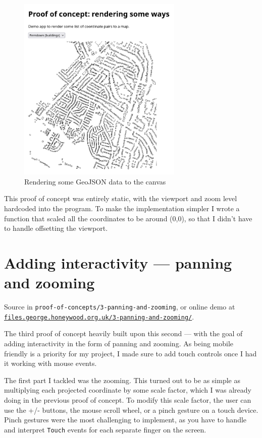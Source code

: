 \documentclass{final_report}
\begin{document}
\begin{figure}[ht]
    \centering
    \includegraphics[width=0.7\textwidth]{../proof-of-concepts/2-rendering-a-way/screenshots/ferndown-buildings.png}
    \caption{Rendering some GeoJSON data to the canvas}\label{fig:rendering-geometry}
\end{figure}

This proof of concept was entirely static, with the viewport and zoom level hardcoded into the program. To make the implementation simpler I wrote a function that scaled all the coordinates to be around (0,0), so that I didn't have to handle offsetting the viewport.

\section{Adding interactivity --- panning and zooming}

{ \footnotesize Source in \texttt{proof-of-concepts/3-panning-and-zooming}, or online demo at \href{https://files.george.honeywood.org.uk/3-panning-and-zooming/}{\nolinkurl{files.george.honeywood.org.uk/3-panning-and-zooming/}}.}

The third proof of concept heavily built upon this second --- with the goal of adding interactivity in the form of panning and zooming. As being mobile friendly is a priority for my project, I made sure to add touch controls once I had it working with mouse events.

The first part I tackled was the zooming. This turned out to be as simple as multiplying each projected coordinate by some scale factor, which I was already doing in the previous proof of concept. To modify this scale factor, the user can use the +/- buttons, the mouse scroll wheel, or a pinch gesture on a touch device. Pinch gestures were the most challenging to implement, as you have to handle and interpret \texttt{Touch} events for each separate finger on the screen.
\end{document}

